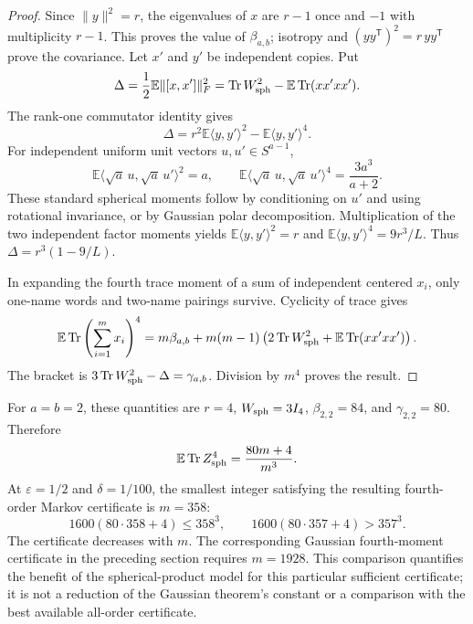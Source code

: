 \documentclass[11pt,a4paper]{article}
\theoremstyle{definition}\newtheorem{definition}[theorem]{Definition}
\theoremstyle{remark}\newtheorem{remark}[theorem]{Remark}
\numberwithin{equation}{section}
\begin{document}
\begin{proof}
Since $\|y\|^2=r$, the eigenvalues of $x$ are $r-1$ once and
$-1$ with multiplicity $r-1$.  This proves the value of $\beta_{a,b}$;
isotropy and $(yy^{\mathsf T})^2=r\,yy^{\mathsf T}$ prove the covariance.
Let $x'$ and $y'$ be independent copies.  Put
\[
 \Delta=\frac12\mathbb E\|[x,x']\|_F^2
 =\operatorname{Tr}W_{\rm sph}^2
       -\mathbb E\operatorname{Tr}(xx'xx').
\]
The rank-one commutator identity gives
\[
 \Delta=r^2\mathbb E\langle y,y'\rangle^2
              -\mathbb E\langle y,y'\rangle^4.
\]
For independent uniform unit vectors $u,u'\in S^{a-1}$,
\[
 \mathbb E\langle\sqrt a\,u,\sqrt a\,u'\rangle^2=a,
 \qquad
 \mathbb E\langle\sqrt a\,u,\sqrt a\,u'\rangle^4
       =\frac{3a^3}{a+2}.
\]
These standard spherical moments follow by conditioning on $u'$ and
using rotational invariance, or by Gaussian polar decomposition.
Multiplication of the two independent factor moments yields
$\mathbb E\langle y,y'\rangle^2=r$ and
$\mathbb E\langle y,y'\rangle^4=9r^3/L$.
Thus $\Delta=r^3(1-9/L)$.

In expanding the fourth trace moment of a sum of independent centered
$x_i$, only one-name words and two-name pairings survive.  Cyclicity
of trace gives
\[
 \mathbb E\operatorname{Tr}\left(\sum_{i=1}^m x_i\right)^4
 =m\beta_{a,b}
  +m(m-1)\left(2\operatorname{Tr}W_{\rm sph}^2
                     +\mathbb E\operatorname{Tr}(xx'xx')\right).
\]
The bracket is $3\operatorname{Tr}W_{\rm sph}^2-\Delta
=\gamma_{a,b}$.  Division by $m^4$ proves the result.
\end{proof}

For $a=b=2$, these quantities are $r=4$, $W_{\rm sph}=3I_4$,
$\beta_{2,2}=84$, and $\gamma_{2,2}=80$.  Therefore
\begin{equation}\label{eq:spherical-fourth-example}
 \mathbb E\operatorname{Tr}Z_{\rm sph}^4
       =\frac{80m+4}{m^3}.
\end{equation}
At $\varepsilon=1/2$ and $\delta=1/100$, the smallest integer satisfying
the resulting fourth-order Markov certificate is $m=358$:
\[
 1600(80\cdot358+4)\le358^3,
 \qquad
 1600(80\cdot357+4)>357^3.
\]
The certificate decreases with $m$.  The corresponding Gaussian
fourth-moment certificate in the preceding section requires $m=1928$.
This comparison quantifies the benefit of the spherical-product model
for this particular sufficient certificate; it is not a reduction of
the Gaussian theorem's constant or a comparison with the best available
all-order certificate.
\end{document}
